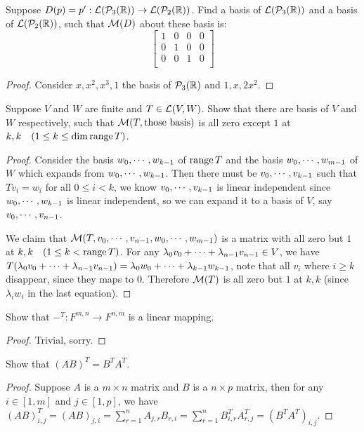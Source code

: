 \documentclass[../main.tex]{subfiles}
\begin{document}
\setcounter{exercise}{3}
\begin{exercise}
  Suppose $D(p) = p^\prime : \LT(\Poly[_3]) \rightarrow \LT(\Poly[_2])$.
  Find a basis of $\LT(\Poly[_3])$ and a basis of $\LT(\Poly[_2])$, such that
  $\M(D)$ about these basis is:
  \[
    \begin{bmatrix}
      1 & 0 & 0 & 0 \\
      0 & 1 & 0 & 0 \\
      0 & 0 & 1 & 0 \\
    \end{bmatrix}
  \]
\end{exercise}
\begin{proof}
  Consider $x, x^2, x^3, 1$ the basis of $\Poly[_3]$ and $1, x, 2x^2$.
\end{proof}

\begin{exercise}
  Suppose $V$ and $W$ are finite and $T \in \LT(V, W)$. Show that there are basis of $V$ and $W$ respectively,
  such that $\M(T, \text{those basis})$ is all zero except $1$ at $k, k \quad (1 \le k \le \dim \rangev T)$.
\end{exercise}
\begin{proof}
  Consider the basis $\join{w}{k - 1}$ of $\rangev T$ and the basis $\join{w}{m - 1}$
  of $W$ which expands from $\join{w}{k - 1}$. Then there must be $\join{v}{k - 1}$
  such that $Tv_i = w_i$ for all $0 \le i < k$, we know $\join{v}{k - 1}$ is linear independent
  since $\join{w}{k - 1}$ is linear independent, so we can expand it to a basis of $V$,
  say $\join{v}{n - 1}$.

  We claim that $\M(T, \join{v}{n - 1}, \join{w}{m - 1})$ is a matrix
  with all zero but $1$ at $k, k \quad (1 \le k < \rangev T)$. For any
  $\joinp[+]{\lambda}{v}{n - 1} \in V$,
  we have $T(\joinp[+]{\lambda}{v}{n - 1}) = \joinp[+]{\lambda}{w}{k - 1}$,
  note that all $v_i$ where $i \ge k$ disappear, since they maps to $0$. Therefore
  $\M(T)$ is all zero but $1$ at $k, k$ (since $\lambda_iw_i$ in the last equation).
\end{proof}

\begin{exercise}
  Show that $-^T : F^{m, n} \rightarrow F^{n, m}$ is a linear mapping.
\end{exercise}
\begin{proof}
  Trivial, sorry.
\end{proof}

\begin{exercise}
  Show that $(AB)^T = B^TA^T$.
\end{exercise}
\begin{proof}
  Suppose $A$ is a $m \times n$ matrix and $B$ is a $n \times p$ matrix,
  then for any $i \in [1, m]$ and $j \in [1, p]$, we have
  $(AB)^T_{i, j} = (AB)_{j, i} = \displaystyle \sum_{r = 1}^{n}A_{j, r}B_{r, i} = \sum_{r = 1}^{n}B^T_{i, r}A^T_{r, j} = (B^TA^T)_{i, j}$.
\end{proof}
\end{document}
